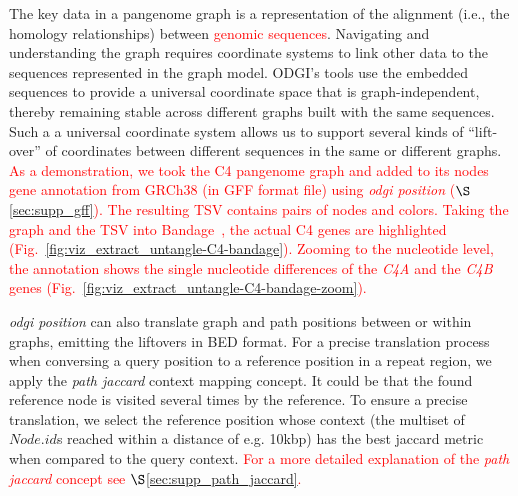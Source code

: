 \documentclass{bioinfo}
\newcommand{\REVIEWED}[1]{{\textcolor{Red}{#1}}}
\begin{document}
The key data in a pangenome graph is a representation of the alignment (i.e., the homology relationships) between \REVIEWED{genomic sequences}.
Navigating and understanding the graph requires coordinate systems to link other data to the sequences represented in the graph model.
ODGI's tools use the embedded sequences to provide a universal coordinate space that is graph-independent, thereby remaining stable across different graphs built with the same sequences.
Such a a universal coordinate system allows us to support several kinds of ``lift-over'' of coordinates between different sequences in the same or different graphs.
\REVIEWED{As a demonstration, we took the C4 pangenome graph and added to its nodes gene annotation from GRCh38 (in GFF format file) using \textit{odgi position} ($\S$\ref{sec:supp_gff}). The resulting TSV contains pairs of nodes and colors. Taking the graph and the TSV into Bandage~\citep{Wick_2015}, the actual C4 genes are highlighted (Fig.~\ref{fig:viz_extract_untangle-C4-bandage}). Zooming to the nucleotide level, the annotation shows the single nucleotide differences of the \textit{C4A} and the \textit{C4B} genes (Fig.~\ref{fig:viz_extract_untangle-C4-bandage-zoom}).}

\textit{odgi position} can also translate graph and path positions between or within graphs, emitting the liftovers in BED format.
For a precise translation process when conversing a query position to a reference position in a repeat region, we apply the \textit{path jaccard} context mapping concept.
It could be that the found reference node is visited several times by the reference.
To ensure a precise translation, we select the reference position whose context (the multiset of $Node.id$s reached within a distance of e.g. 10kbp) has the best jaccard metric when compared to the query context. \REVIEWED{For a more detailed explanation of the \textit{path jaccard} concept see $\S$\ref{sec:supp_path_jaccard}.}

\end{document}
